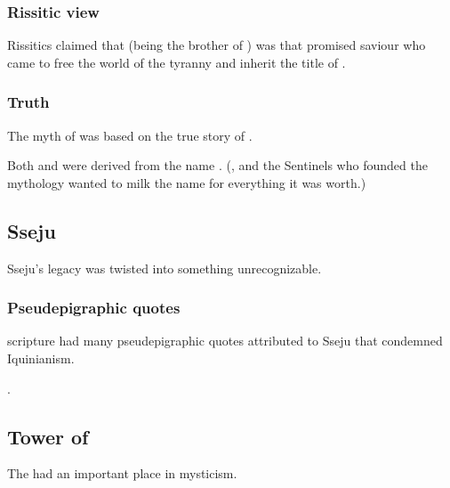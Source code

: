 \subsubsection{Rissitic view}
Rissitics claimed that  (being the brother of ) was that promised saviour who came to free the world of the \iquinian tyranny and inherit the title of \Nechsain. 





\subsubsection{Truth}
The myth of \Mezzagrael was based on the true story of . 

Both \quo{\Mezzagrael} and \quo{\Nechsain} were derived from the name \quo{\Nexagglachel}. 
(, and the Sentinels who founded the \Ortaican mythology wanted to milk the name for everything it was worth.)









\subsection{Sseju}
Sseju's legacy was twisted into something unrecognizable.





\subsubsection{Pseudepigraphic quotes}
\Ortaican scripture had many pseudepigraphic quotes attributed to Sseju that condemned Iquinianism.

{\VizicarDurasRespina} . 









\subsection{Tower of \Haamon}
The  had an important place in \rethyax mysticism. 
















